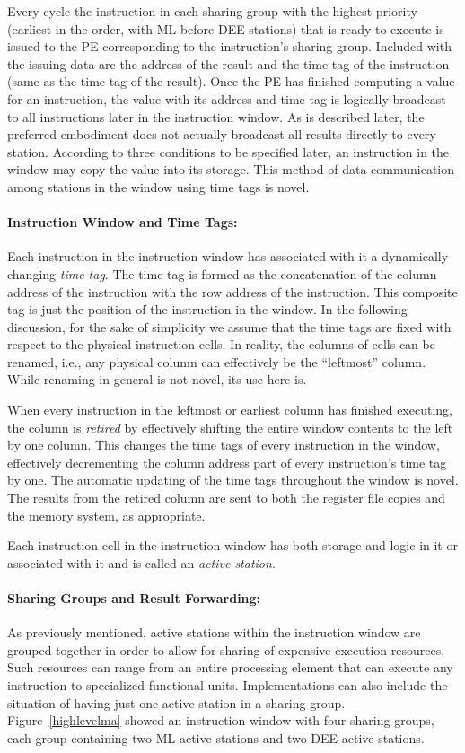\documentclass[10pt,dvips]{article}
\begin{document}
Every cycle the instruction in each sharing group
with the highest priority (earliest in
the order, with ML before DEE stations) that is ready to execute is issued to the
PE corresponding to the
instruction's sharing group.
Included with the issuing data are the address of the result and
the time tag of the instruction (same as the time tag of the result).
Once the PE has finished computing a value for an instruction, the value with
its address and time tag
is logically
broadcast to all instructions later in the instruction window. As is described
later, the preferred embodiment does not actually broadcast all results
directly to every station.
According to three
conditions to be specified later, an instruction in the window may copy the
value into its storage. This method of data communication among
stations in the window using time tags is novel.

\paragraph{Instruction Window and Time Tags: }
Each instruction in the instruction window has associated with it a dynamically
changing  {\it time tag}. The time tag is formed as the concatenation of the
column address of the instruction with the row address of the instruction. This
composite tag is just the position of the instruction in the window.
In the following discussion, for the sake of simplicity we assume that
the time tags
are fixed with respect to the physical instruction cells. In reality, the columns
of cells can be renamed, i.e., any physical column can effectively be the ``leftmost''
column. While renaming in general is not novel, its use here is.

When every instruction in the leftmost or earliest column has finished executing,
the column is {\it retired} by effectively shifting the entire window contents
to the left by one column. This changes the time tags of every instruction in
the window, effectively decrementing the column address part of every instruction's
time tag by one. The automatic updating of the time tags throughout the window is
novel. The results from the retired column are sent to both the register
file copies and the memory system, as appropriate.

Each instruction cell in the instruction window has both storage and logic in
it or associated with it and is called an {\it active station}. 

\paragraph{Sharing Groups and Result Forwarding: }
As previously mentioned, active stations within the instruction
window are grouped together in
order to allow for sharing of expensive execution resources.  Such
resources can range from an entire processing element that
can execute any instruction to specialized functional units.
Implementations can also include the situation of having just one
active station in a sharing group.  Figure~\ref{highlevelma}
showed an instruction window with four sharing groups, each group
containing two ML active stations and two DEE active stations.
\end{document}

